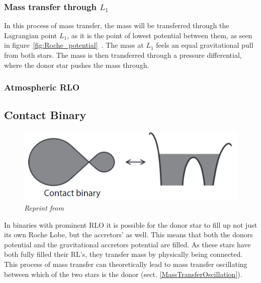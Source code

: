 \documentclass[12pt, a4paper]{article}
\begin{document}
        \subsubsection{Mass transfer through $L_1$} \label{L1MassTransfer}

        In this process of mass transfer, the mass will be transferred through the Lagrangian point $L_1$, as it is the point of lowest potential between them, as seen in figure~\ref{fig:Roche_potential}~\parencite{TaurisvandenHeuvel+2023}. The mass at $L_1$ feels an equal gravitational pull from both stars. The mass is then transferred through a pressure differential, where the donor star pushes the mass through. 

        \subsubsection{Atmospheric RLO} \label{atmosphericRLO}

        \subsection{Contact Binary}

        \begin{figure}[H]
            \centering
            \includegraphics[scale = .4]{Figs/reused-figs/Tauris_ContactBinary.png}

            \caption{\textit{Reprint from~\parencite{TaurisvandenHeuvel+2023}}}
            \label{ContactBinaryRL}
        \end{figure}

        In binaries with prominent RLO it is possible for the donor star to fill up not just its own Roche Lobe, but the accretors' as well. This means that both the donors  potential and the gravitational accretors potential are filled. \parencite{TaurisvandenHeuvel+2023} As these stars have both fully filled their RL's, they transfer mass by physically being connected. This process of mass transfer can theoretically lead to mass transfer oscillating between which of the two stars is the donor (sect. \ref{MassTransferOscillation}). 
        
\end{document}
